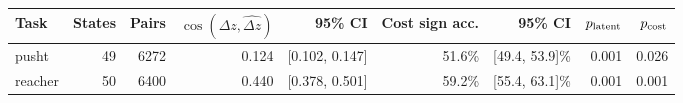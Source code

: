 \begin{tabular}{lrrrrrrrr}
\toprule
Task & States & Pairs & $\cos(\Delta z,\widehat{\Delta z})$ & 95\% CI & Cost sign acc. & 95\% CI & $p_{\rm latent}$ & $p_{\rm cost}$ \\
\midrule
pusht & 49 & 6272 & 0.124 & [0.102, 0.147] & 51.6\% & [49.4, 53.9]\% & 0.001 & 0.026 \\
reacher & 50 & 6400 & 0.440 & [0.378, 0.501] & 59.2\% & [55.4, 63.1]\% & 0.001 & 0.001 \\
\bottomrule
\end{tabular}
